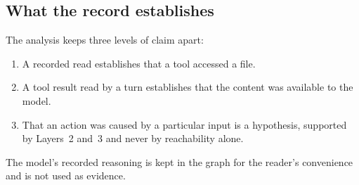 \subsection{What the record establishes}

The analysis keeps three levels of claim apart:
\begin{enumerate}
  \item A recorded read establishes that a tool accessed a file.
  \item A tool result read by a turn establishes that the content was available to the model.
  \item That an action was caused by a particular input is a hypothesis, supported by Layers~2 and~3 and never by reachability alone.
\end{enumerate}
The model's recorded reasoning is kept in the graph for the reader's convenience and is not used as evidence.
